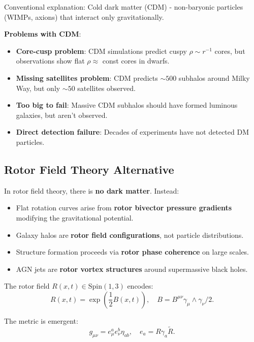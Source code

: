 \documentclass[12pt,a4paper]{article}
\theoremstyle{definition}
\theoremstyle{remark}
\begin{document}
Conventional explanation: Cold dark matter (CDM) - non-baryonic particles (WIMPs, axions) that interact only gravitationally.

\textbf{Problems with CDM}:
\begin{itemize}
\item \textbf{Core-cusp problem}: CDM simulations predict cuspy $\rho \sim r^{-1}$ cores, but observations show flat $\rho \approx$ const cores in dwarfs.
\item \textbf{Missing satellites problem}: CDM predicts $\sim 500$ subhalos around Milky Way, but only $\sim 50$ satellites observed.
\item \textbf{Too big to fail}: Massive CDM subhalos should have formed luminous galaxies, but aren't observed.
\item \textbf{Direct detection failure}: Decades of experiments have not detected DM particles.
\end{itemize}

\subsection{Rotor Field Theory Alternative}

In rotor field theory, there is \textbf{no dark matter}. Instead:

\begin{itemize}
\item Flat rotation curves arise from \textbf{rotor bivector pressure gradients} modifying the gravitational potential.
\item Galaxy halos are \textbf{rotor field configurations}, not particle distributions.
\item Structure formation proceeds via \textbf{rotor phase coherence} on large scales.
\item AGN jets are \textbf{rotor vortex structures} around supermassive black holes.
\end{itemize}

The rotor field $R(x,t) \in \mathrm{Spin}(1,3)$ encodes:
\begin{equation}
R(x,t) = \exp\left(\frac{1}{2} B(x,t)\right), \quad B = B^{\mu\nu} \gamma_\mu \wedge \gamma_\nu / 2.
\end{equation}

The metric is emergent:
\begin{equation}
g_{\mu\nu} = e_\mu^a e_\nu^b \eta_{ab}, \quad e_a = R \gamma_a \tilde{R}.
\end{equation}
\end{document}
